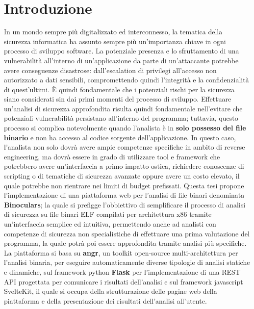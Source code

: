 \documentclass[../main.tex]{subfiles}
\begin{document}
\chapter{Introduzione}
\label{chap:intro}
In un mondo sempre più digitalizzato ed interconnesso, la tematica della sicurezza informatica ha assunto sempre più un'importanza chiave in ogni processo di sviluppo software. 
La potenziale presenza e lo sfruttamento di una vulnerabilità all'interno di un'applicazione da parte di un'attaccante potrebbe avere conseguenze disastrose: dall'escalation di privilegi
all'accesso non autorizzato a dati sensibili, compromettendo quindi l'integrità e la confidenzialità di quest'ultimi.
È quindi fondamentale che i potenziali rischi per la sicurezza siano considerati sin dai primi momenti del processo di sviluppo.
Effettuare un'analisi di sicurezza approfondita risulta quindi fondamentale nell'evitare che potenziali vulnerabilità persistano all'interno del programma; tuttavia, questo processo
si complica notevolmente quando l'analista è in \textbf{solo possesso del file binario} e non ha accesso al codice sorgente dell'applicazione.
In questo caso, l'analista non solo dovrà avere ampie competenze specifiche in ambito di reverse engineering, ma dovrà essere in grado di utilizzare tool e framework che potrebbero avere
un'interfaccia a primo impatto ostica, richiedere conoscenze di scripting o di tematiche di sicurezza avanzate oppure avere un costo elevato, il quale potrebbe non rientrare nei limiti
di budget prefissati. 
Questa tesi propone l'implementazione di una piattaforma web per l'analisi di file binari denominata \textbf{Binoculars}; la quale si prefigge l'obbiettivo di
semplificare il processo di analisi di sicurezza su file binari ELF compilati per architettura x86 tramite un'interfaccia semplice ed intuitiva, permettendo anche ad analisti con competenze di sicurezza non specialistiche di 
effettuare una prima valutazione del programma, la quale potrà poi essere approfondita tramite analisi più specifiche.
La piattaforma si basa su \textbf{angr}, un toolkit open-source multi-architettura per l'analisi binaria, per eseguire automaticamente diverse tipologie di analisi statiche e dinamiche, sul framework python \textbf{Flask} per l'implementazione di una REST API progettata per 
comunicare i risultati dell'analisi e sul framework javascript SvelteKit, il quale si occupa della strutturazione delle pagine web della piattaforma e della presentazione dei risultati dell'analisi all'utente.
\end{document}
